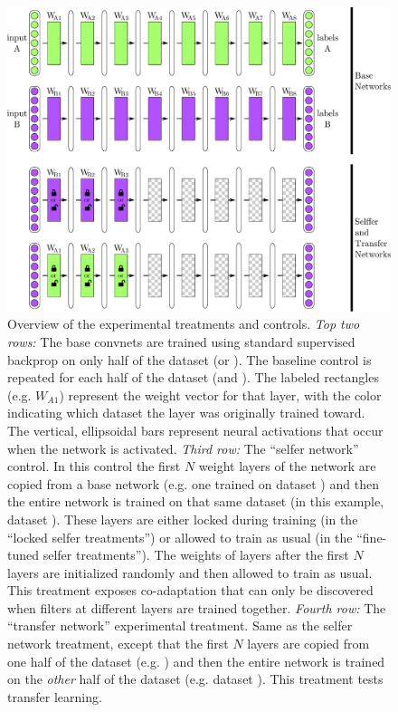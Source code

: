\begin{figure}[t]
\begin{center}
\includegraphics[width=.8\linewidth]{drawings/transfer.pdf}
\end{center}
\caption{Overview of the experimental treatments and controls. \emph{Top two rows:} The base convnets are trained using standard supervised backprop on only half of the dataset (\dA or \dB). The baseline control is repeated for each half of the dataset (\dA and \dB). The labeled rectangles (e.g. $W_{A1}$) represent the weight vector for that layer, with the color indicating which dataset the layer was originally trained toward. The vertical, ellipsoidal bars represent neural activations that occur when the network is activated.
\emph{Third row:} The ``selfer network'' control. In this control the first $N$ weight layers of the network are copied from a base network (e.g. one trained on dataset \dB) and then the entire network is trained on that same dataset (in this example, dataset \dB). These layers are either locked during training (in the ``locked selfer treatments'') or allowed to train as usual (in the ``fine-tuned selfer treatments''). The weights of layers after the first $N$ layers are initialized randomly and then allowed to train as usual. This treatment exposes co-adaptation that can only be discovered when filters at different layers are trained together. \emph{Fourth row:} The ``transfer network'' experimental treatment. Same as the selfer network treatment, except that the first $N$ layers are copied from one half of the dataset (e.g. \dA) and then the entire network is trained on the \emph{other} half of the dataset (e.g. dataset \dB). This treatment tests transfer learning.}
\label{fig:transfer}
\end{figure}



